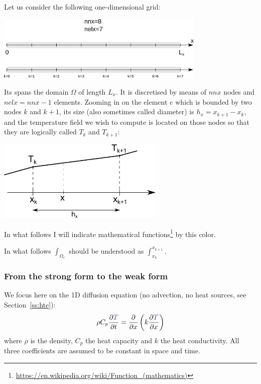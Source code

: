 
Let us consider the following one-dimensional grid: 
\begin{center}
\includegraphics[width=10cm]{images/oneD/domain}
\end{center}
Its spans the domain $\Omega$ of length $L_x$. 
It is discretised by means of 
$nnx$ nodes and $nelx=nnx-1$ elements.
Zooming in on the element $e$ which is bounded by two nodes $k$ and $k+1$,
its size (also sometimes called diameter) is $h_x=x_{k+1}-x_k$, 
and the temperature field we wish to compute is located on those 
nodes so that they are logically called $T_k$ and $T_{k+1}$:

\begin{center}
\includegraphics[width=8cm]{images/oneD/el1D}
\end{center}

\begin{remark}
In what follows I will indicate 
mathematical functions\footnote{\url{https://en.wikipedia.org/wiki/Function_(mathematics)}} 
by this {\color{Violet} color}.
\end{remark}

\begin{remark}
In what follows $\int_{\Omega_e}$ should be understood as $\int_{x_k}^{x_{k+1}}$.
\end{remark}


\subsubsection{From the strong form to the weak form}

We focus here on the 1D diffusion equation (no advection, no heat sources, see Section~\ref{ss:hte}):
\begin{equation}
\rho C_p \frac{\partial {\color{Violet}T}}{\partial t} 
= \frac{\partial }{\partial x} \left( k \frac{\partial {\color{Violet}T}}{\partial x}  \right)
\end{equation}
where $\rho$ is the density, $C_p$ the heat capacity and $k$ the heat conductivity. All three coefficients
are assumed to be constant in space and time.

